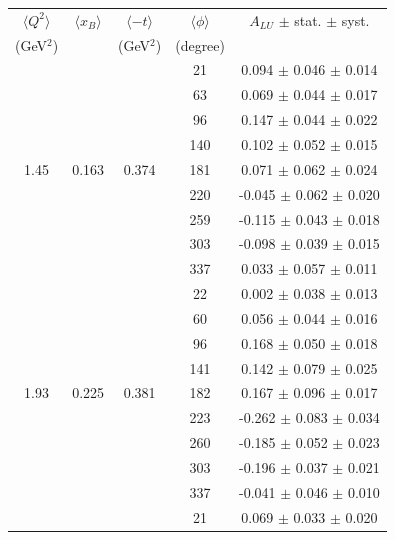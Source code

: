 \documentclass[aps,prc,preprint,superscriptaddress]{revtex4}
\begin{document}
\begin{table}[!h]
   \begin{center}
      \begin{tabular}{|c|c|c|c|c|}
         \hline
 $\langle Q^{2} \rangle$ & $\langle x_{B} \rangle$ & $\langle -t \rangle$ & $\langle \phi \rangle$ & $A_{LU}$ $\pm$ stat. $\pm$ syst.\\
 (GeV$^{2}$) &           & (GeV$^{2}$) & (degree) &  \\
         \hline
        &       &       &  21    &  0.094  $\pm$ 0.046   $\pm$  0.014  \\ 
        &       &       &  63    &  0.069  $\pm$ 0.044   $\pm$  0.017  \\ 
        &       &       &  96    &  0.147  $\pm$ 0.044   $\pm$  0.022  \\ 
        &       &       & 140    &  0.102  $\pm$ 0.052   $\pm$  0.015  \\ 
  1.45  & 0.163 & 0.374 & 181    &  0.071  $\pm$ 0.062   $\pm$  0.024  \\ 
        &       &       & 220    & -0.045  $\pm$ 0.062   $\pm$  0.020  \\ 
        &       &       & 259    & -0.115  $\pm$ 0.043   $\pm$  0.018  \\ 
        &       &       & 303    & -0.098  $\pm$ 0.039   $\pm$  0.015  \\ 
        &       &       & 337    &  0.033  $\pm$ 0.057   $\pm$  0.011  \\ 
  \hline
        &       &       &  22    &  0.002  $\pm$ 0.038   $\pm$  0.013  \\
        &       &       &  60    &  0.056  $\pm$ 0.044   $\pm$  0.016  \\
        &       &       &  96    &  0.168  $\pm$ 0.050   $\pm$  0.018  \\
        &       &       & 141    &  0.142  $\pm$ 0.079   $\pm$  0.025  \\
  1.93  & 0.225 & 0.381 & 182    &  0.167  $\pm$ 0.096   $\pm$  0.017  \\
        &       &       & 223    & -0.262  $\pm$ 0.083   $\pm$  0.034  \\
        &       &       & 260    & -0.185  $\pm$ 0.052   $\pm$  0.023  \\
        &       &       & 303    & -0.196  $\pm$ 0.037   $\pm$  0.021  \\
        &       &       & 337    & -0.041  $\pm$ 0.046   $\pm$  0.010  \\
  \hline
        &       &       &  21    &  0.069  $\pm$ 0.033   $\pm$  0.020  \\

\end{tabular}
\end{center}
\end{table}
\end{document}
